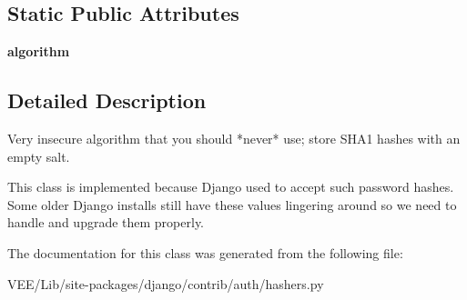 \subsection*{Static Public Attributes}
\begin{DoxyCompactItemize}
\item 
\mbox{\label{classdjango_1_1contrib_1_1auth_1_1hashers_1_1_unsalted_s_h_a1_password_hasher_ac9f9508279018e70598634eda91de114}} 
{\bfseries algorithm}
\end{DoxyCompactItemize}


\subsection{Detailed Description}
\begin{DoxyVerb}Very insecure algorithm that you should *never* use; store SHA1 hashes
with an empty salt.

This class is implemented because Django used to accept such password
hashes. Some older Django installs still have these values lingering
around so we need to handle and upgrade them properly.
\end{DoxyVerb}
 

The documentation for this class was generated from the following file\+:\begin{DoxyCompactItemize}
\item 
V\+E\+E/\+Lib/site-\/packages/django/contrib/auth/hashers.\+py\end{DoxyCompactItemize}
